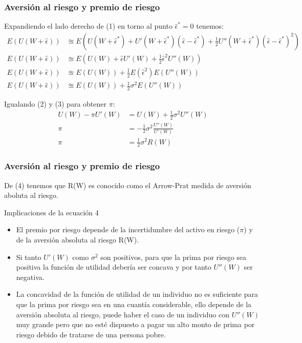 \begin{frame}
    \frametitle{Aversión al riesgo y premio de riesgo}
   Expandiendo el lado derecho de (1) en torno al punto $\hat{\epsilon}^{*}=0 $ tenemos:
    \begin{align}
   E(U(W+\hat{\epsilon}))&\approxeq E(U(W+\hat{\epsilon}^{*})+U'(W+\hat{\epsilon}^{*})(\hat{\epsilon}-\hat{\epsilon}^{*})+\frac{1}{2}U''(W+\hat{\epsilon}^{*})(\hat{\epsilon}-\hat{\epsilon}^{*})^{2}) \nonumber \\
   E(U(W+\hat{\epsilon}))&\approxeq E(U(W)+\hat{\epsilon}U'(W)+\frac{1}{2}\hat{\epsilon}^{2}U''(W))\nonumber \\
    E(U(W+\hat{\epsilon}))&\approxeq E(U(W))+\frac{1}{2}E(\hat{\epsilon}^{2})E(U''(W))\nonumber \\
     E(U(W+\hat{\epsilon}))&\approxeq E(U(W))+\frac{1}{2}\sigma^{2}E(U''(W))
 \end{align} 
 
 Igualando (2) y (3) para obtener $\pi$:
   \begin{align}
 U(W)-\pi U'(W)&=U(W)+\frac{1}{2}\sigma^{2}U''(W) \nonumber \\
 \pi &=-\frac{1}{2}\sigma^{2}\frac{U''(W) }{U'(W) }\nonumber \\
 \pi &=\frac{1}{2}\sigma^{2} R(W)
 \end{align} 
 
 
  
\end{frame}


\begin{frame}
    \frametitle{Aversión al riesgo y premio de riesgo}
    De (4) tenemos que R(W) es conocido como el Arrow-Prat medida de aversión aboluta al riesgo.\\
    
    \begin{block} {Implicaciones de la ecuación 4}
       \begin{itemize}
           \item El premio por riesgo depende de la incertidumbre del activo en riesgo ($\pi $) y de la aversión absoluta al riesgo R(W). 
           \item Si tanto $U'(W) $ como $\sigma^{2}$ son positivos, para que la prima por riesgo sea positiva la función de utilidad debería ser concava y por tanto  $U''(W) $ ser negativa.
           \item La concavidad de la función de utilidad de un individuo no es suficiente para que la prima por riesgo sea en una cuantía considerable, ello depende de la aversión absoluta al riesgo, puede haber el caso de un individuo con $U''(W) $ muy grande pero que no esté dispuesto a pagar un alto monto de prima por riesgo debido de tratarse de una persona pobre.
       \end{itemize} 
    \end{block}	
    
\end{frame}

